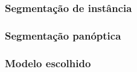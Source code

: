 \subsubsection*{Segmentação de instância}


\subsubsection*{Segmentação panóptica}



\subsubsection*{Modelo escolhido}


